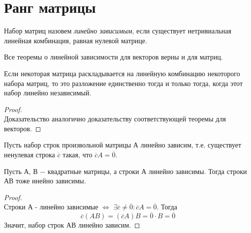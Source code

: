 \section{Ранг матрицы}

\begin{definition}
   Набор матриц назовем \textit{линейно зависимым}, если существует нетривиальная линейная комбинация, равная нулевой матрице. 
\end{definition}

Все теоремы о линейной зависимости для векторов верны и для матриц.\\

\begin{theorem}
    Если некоторая матрица раскладывается на линейную комбинацию некоторого набора матриц, то это разложение единственно тогда и только тогда, когда этот набор линейно независимый.
\end{theorem}
\begin{proof}
    \tab\\
    
    Доказательство аналогично доказательству соответствующей теоремы для векторов.
\end{proof}

Пусть набор строк произвольной матрицы А линейно зависим, т.е. существует ненулевая строка $\overline{c}$ такая, что \textbf{$\overline{c}A = \overline{0}$}.

\begin{theorem}
    Пусть А, В $-$ квадратные матрицы, а строки А линейно зависимы. Тогда строки АВ тоже инейно зависимы.
\end{theorem}
\begin{proof}
    \tab\\
    
    Строки А - линейно зависимые $\Longleftrightarrow$ $\exists \overline{c}\neq\overline{0} : \overline{c}A = \overline{0}$. Тогда
    \[
    \overline{c}(AB) = (\overline{c}A)B = \overline{0} \cdot B = \overline{0}
    \]
    Значит, набор строк АВ линейно зависим.
\end{proof}

